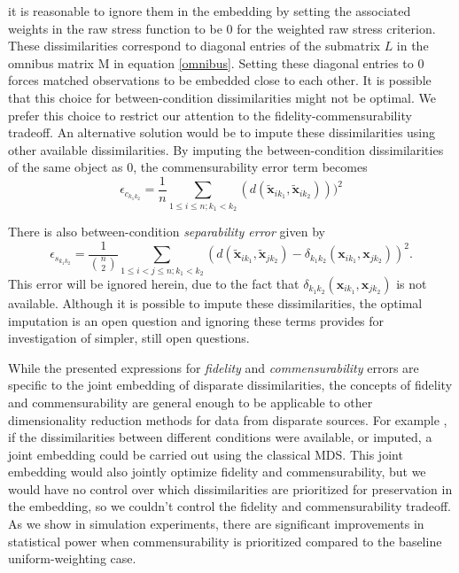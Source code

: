 \documentclass[12pt,oneside,final]{thesis}\usepackage[]{graphicx}\usepackage[]{color}
\begin{document}
it is reasonable to  ignore them in the embedding by setting the associated weights in the raw stress function to be 0 for the weighted raw stress criterion. These dissimilarities correspond to  diagonal  entries of the  submatrix $L$ in  the omnibus matrix  M in equation \eqref{omnibus}. Setting these diagonal entries to $0$ forces matched observations to be embedded close to each other.  It is possible that this choice for between-condition dissimilarities might not be optimal. 
 We prefer this choice to  restrict our attention to  the fidelity-commensurability tradeoff. An alternative solution would be to impute these dissimilarities using other available dissimilarities.
By imputing the between-condition dissimilarities of the same object as 0, the commensurability error  term becomes
  \[
\epsilon_{c_{k_1k_2}} = \frac{1}{n} \sum_{1 \leq i \leq n;k_1< k_2} (d(\widetilde{\bm{x}}_{ik_1},\widetilde{\bm{x}}_{ik_2})))^2
\]






 There is also between-condition {\em separability error} given by
    $$\epsilon_{s_{k_1k_2}} = \frac{1}{{{n}\choose{2}}} \sum_{1 \leq i < j \leq n;k_1 <k_2} (d(\widetilde{\bm{x}}_{ik_1},\widetilde{\bm{x}}_{jk_2})-{ \delta_{k_1k_2}}(\bm{x}_{ik_1},\bm{x}_{jk_2}))^2.$$ This error will be ignored herein, due to the fact that 
$\delta_{k_1k_2}(\bm{x}_{ik_1},\bm{x}_{jk_2})$ is not  available. Although it is possible to impute these dissimilarities, the optimal  imputation is an open question and ignoring these terms provides for investigation of simpler, still open questions.




While  the presented  expressions for  \emph{fidelity} and  \emph{commensurability} errors  are specific to the joint embedding of disparate dissimilarities, the concepts of fidelity and commensurability are  general enough to be applicable to other dimensionality reduction methods for data from disparate sources.  For example , if the dissimilarities between different conditions were available, or imputed, a joint embedding could be carried out using the classical MDS. This joint embedding would also jointly optimize fidelity  and commensurability, but we would have no control over which dissimilarities are prioritized for preservation in the embedding, so we couldn't control the fidelity and commensurability tradeoff. As we show in simulation experiments, there are significant improvements in statistical power when commensurability is prioritized compared to the baseline uniform-weighting case.
   
\end{document}
